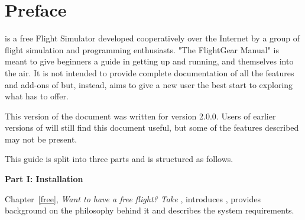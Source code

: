 
\chapter*{Preface}
\label{preface}

\FlightGear{} is a free Flight Simulator developed cooperatively over the Internet 
by a group of flight simulation and programming enthusiasts. "The
FlightGear Manual" is meant to give beginners a guide in getting
\FlightGear{} up and running, and themselves into the air. It is not
intended to provide complete documentation of all the features and
add-ons of \FlightGear{} but, instead, aims to give a new user the best
start to exploring what \FlightGear{} has to offer.

This version of the document was written for \FlightGear{} version 2.0.0.
Users of earlier versions of \FlightGear{} will still find this document
useful, but some of the features described may not be present.

This guide is split into three parts and is structured as follows.

\medskip

\noindent
\textbf{Part I: Installation}
\medskip

 \noindent
Chapter~\ref{free}, \textit{Want to have a free flight? Take \FlightGear{}}, introduces
\FlightGear{}, provides background on the philosophy behind it and describes the system requirements.
 \medskip

